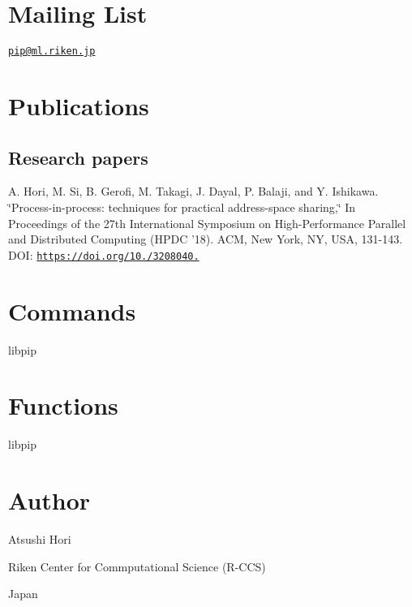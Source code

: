 \section*{Mailing List}

\href{mailto:pip@ml.riken.jp}{\tt pip@ml.\-riken.\-jp}

\section*{Publications}

\subsection*{Research papers}

A. Hori, M. Si, B. Gerofi, M. Takagi, J. Dayal, P. Balaji, and Y. Ishikawa. \char`\"{}\-Process-\/in-\/process\-: techniques for practical address-\/space sharing,\char`\"{} In Proceedings of the 27th International Symposium on High-\/\-Performance Parallel and Distributed Computing (H\-P\-D\-C '18). A\-C\-M, New York, N\-Y, U\-S\-A, 131-\/143. D\-O\-I\-: \href{https://doi.org/10.1145/3208040.3208045}{\tt https\-://doi.\-org/10./3208040.}

\section*{Commands}


\begin{DoxyItemize}
\item libpip
\end{DoxyItemize}

\section*{Functions}


\begin{DoxyItemize}
\item libpip
\end{DoxyItemize}

\section*{Author}

Atsushi Hori \par
Riken Center for Commputational Science (R-\/\-C\-C\-S) \par
Japan \par
